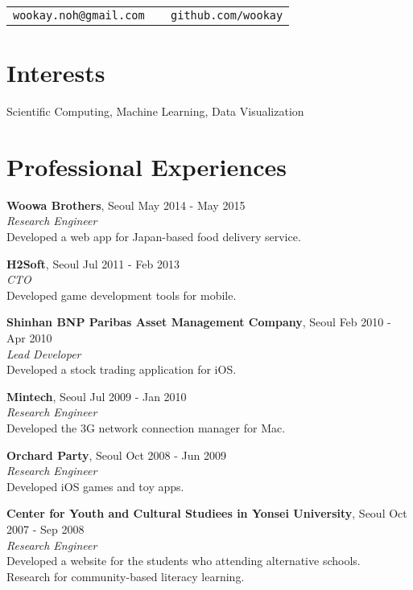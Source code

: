 \documentclass[margin,line]{res}
\begin{document}

\begin{resume}

\vspace{-1.35cm}

\begin{flushright}
\begin{tabular}{@{}l|l}
\texttt{wookay.noh@gmail.com } & \texttt{ github.com/wookay} \\
\end{tabular}
\end{flushright}

\section{\sc Interests}
Scientific Computing, Machine Learning, Data Visualization


\section{\sc Professional Experiences}

{\bf Woowa Brothers}, Seoul \hfill May 2014 - May 2015 \\
{\em Research Engineer} \\
Developed a web app for Japan-based food delivery service.

{\bf H2Soft}, Seoul \hfill Jul 2011 - Feb 2013 \\
{\em CTO} \\
Developed game development tools for mobile.

{\bf Shinhan BNP Paribas Asset Management Company}, Seoul \hfill Feb 2010 - Apr 2010 \\
{\em Lead Developer} \\
Developed a stock trading application for iOS.

{\bf Mintech}, Seoul \hfill Jul 2009 - Jan 2010 \\
{\em Research Engineer} \\
Developed the 3G network connection manager for Mac.

{\bf Orchard Party}, Seoul \hfill Oct 2008 - Jun 2009 \\
{\em Research Engineer} \\
Developed iOS games and toy apps.

{\bf Center for Youth and Cultural Studiees in Yonsei University}, Seoul \hfill Oct 2007 - Sep 2008 \\
{\em Research Engineer} \\
Developed a website for the students who attending alternative schools. \\
Research for community-based literacy learning.


\end{resume}
\end{document}
